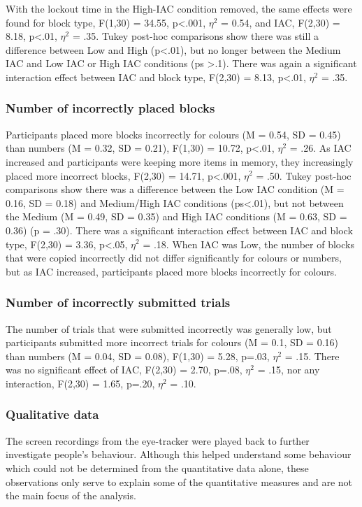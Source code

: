 With the lockout time in the High-IAC condition removed, the same effects were found for block type, F(1,30) = 34.55, p<.001, $\eta^2$ = 0.54, and IAC, F(2,30) = 8.18, p<.01, $\eta^2$ = .35. Tukey post-hoc comparisons show there was still a difference between Low and High (p<.01), but no longer between the Medium IAC and Low IAC or High IAC conditions (ps >.1). There was again a significant interaction effect between IAC and block type, F(2,30) = 8.13, p<.01, $\eta^2$ = .35.

\subsubsection{Number of incorrectly placed blocks}
Participants placed more blocks incorrectly for colours (M = 0.54, SD = 0.45) than numbers (M = 0.32, SD = 0.21), F(1,30) = 10.72, p<.01, $\eta^2$ = .26. %
As IAC increased and participants were keeping more items in memory, they increasingly placed more incorrect blocks, F(2,30) = 14.71, p<.001, $\eta^2$ = .50. Tukey post-hoc comparisons show there was a difference between the Low IAC condition (M = 0.16, SD = 0.18) and Medium/High IAC conditions (ps<.01), but not between the Medium (M = 0.49, SD = 0.35) and High IAC conditions (M = 0.63, SD = 0.36) (p = .30). There was a significant interaction effect between IAC and block type, F(2,30) = 3.36, p<.05, $\eta^2$ = .18. When IAC was Low, the number of blocks that were copied incorrectly did not differ significantly for colours or numbers, but as IAC increased, participants placed more blocks incorrectly for colours.

\subsubsection{Number of incorrectly submitted trials}
The number of trials that were submitted incorrectly was generally low, but participants submitted more incorrect trials for colours (M = 0.1, SD = 0.16) than numbers (M = 0.04, SD = 0.08), F(1,30) = 5.28, p=.03, $\eta^2$ = .15. There was no significant effect of IAC, F(2,30) = 2.70, p=.08, $\eta^2$ = .15, nor any interaction, F(2,30) = 1.65, p=.20, $\eta^2$ = .10.

\subsubsection{Qualitative data}
The screen recordings from the eye-tracker were played back to further investigate people's behaviour. Although this helped understand some behaviour which could not be determined from the quantitative data alone, these observations only serve to explain some of the quantitative measures and are not the main focus of the analysis.

